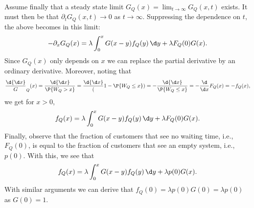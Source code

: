 Assume finally that a steady state limit $G_Q(x) = \lim_{t\to
\infty} G_Q(x,t)$ exists. It must then be that $\partial_t
G_Q(x, t) \to 0$ as $t\to \infty$. Suppressing the dependence on
$t$, the above becomes in this limit:
%
\begin{equation*}
- \partial_x G_Q(x) = \lambda  \int_0^x G(x-y) f_Q(y) \,\d y  + \lambda F_Q(0) G(x).
\end{equation*}
Since $G_Q(x)$ only depends on $x$ we can
replace the partial derivative by an ordinary derivative. Moreover,
noting that
%
\begin{equation*}
\frac \d{\d x} G_Q(x) = \frac \d{\d x} \P{W_Q > x} = \frac \d{\d x}
(1-\P{W_Q \leq x}) = - \frac \d{\d x} \P{W_Q \leq x} = -\frac{\d}{\d x}F_Q(x) = - f_Q(x),
\end{equation*}
we  get for $x>0$,
%
\begin{equation*}
f_Q(x)  = \lambda  \int_0^x G(x-y) f_Q(y) \,\d y  + \lambda F_Q(0) G(x).
\end{equation*}
Finally, observe that the fraction of customers that see no waiting
time, i.e., $F_Q(0)$, is equal to the fraction of customers that
see an empty system, i.e., $p(0)$. With this, we see that
%
\begin{equation*}
f_Q(x)  = \lambda  \int_0^x G(x-y) f_Q(y) \,\d y  + \lambda p(0) G(x).
\end{equation*}
With similar arguments we can derive that $f_Q(0) = \lambda p(0) G(0) = \lambda p(0)$ as $G(0) = 1$.

